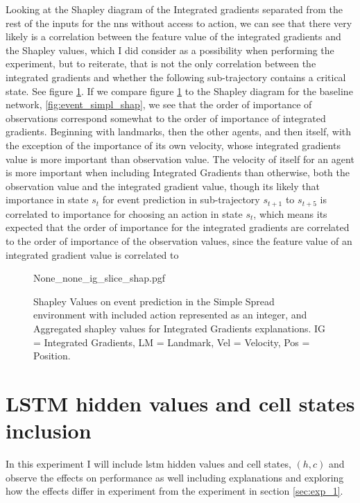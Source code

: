 \documentclass[UKenglish]{uiomasterthesis}
\begin{document}
Looking at the Shapley diagram of the Integrated gradients separated from the rest of the inputs for the \acp{nn} without access to action, we can see that there very likely is a correlation between the feature value of the integrated gradients and the Shapley values, which I did consider as a possibility when performing the experiment, but to reiterate, that is not the only correlation between the integrated gradients and whether the following sub-trajectory contains a critical state. See figure \ref{fig:event_simpl_ig_slice}.
If we compare figure \ref{fig:event_simpl_ig_slice} to the Shapley diagram for the baseline network, \ref{fig:event_simpl_shap}, we see that the order of importance of observations correspond somewhat to the order of importance of integrated gradients. Beginning with landmarks, then the other agents, and then itself, with the exception of the importance of its own velocity, whose integrated gradients value is more important than observation value.
The velocity of itself for an agent is more important when including Integrated Gradients than otherwise, both the observation value and the integrated gradient value, though its likely that importance in state $s_t$ for event prediction in sub-trajectory $s_{t+1}$ to $s_{t+5}$ is correlated to importance for choosing an action in state $s_t$, which means its expected that the order of importance for the integrated gradients are correlated to the order of importance of the observation values, since the feature value of an integrated gradient value is correlated to 


\begin{center}
\begin{figure}[H]
\label{fig:event_simpl_ig_slice}
{None_none_ig_slice_shap.pgf}
\caption{Shapley Values on event prediction in the Simple Spread environment with included action represented as an integer, and Aggregated shapley values for Integrated Gradients explanations. IG = Integrated Gradients, LM = Landmark, Vel = Velocity, Pos = Position.}
\end{figure}
\end{center}


\section{LSTM hidden values and cell states inclusion}
\label{sec:exp_2}
In this experiment I will include \ac{lstm} hidden values and cell states, $(h,c)$ and observe the effects on performance as well including explanations and exploring how the effects differ in experiment from the experiment in section \ref{sec:exp_1}.
\end{document}

